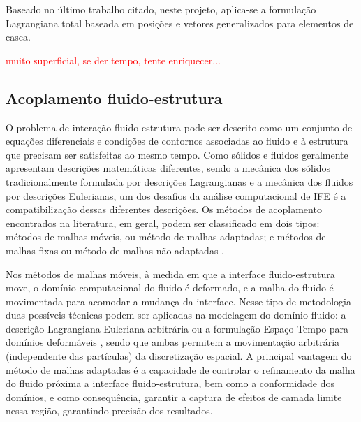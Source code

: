 \documentclass[tese_patricia.tex]{subfiles}
\begin{document}
Baseado no último trabalho citado, neste projeto, aplica-se a formulação Lagrangiana total baseada em posições e vetores generalizados para elementos de casca.

\textcolor{red}{muito superficial, se der tempo, tente enriquecer...}

\subsection{Acoplamento fluido-estrutura}
\label{couplingsection}

O problema de interação fluido-estrutura pode ser descrito como um conjunto de equações diferenciais e condições de contornos associadas ao fluido e à estrutura que precisam ser satisfeitas ao mesmo tempo. Como sólidos e fluidos geralmente apresentam descrições matemáticas diferentes, sendo a mecânica dos sólidos tradicionalmente formulada por descrições Lagrangianas e a mecânica dos fluidos por descrições Eulerianas, um dos desafios da análise computacional de IFE é a compatibilização dessas diferentes descrições. Os métodos de acoplamento encontrados na literatura, em geral, podem ser classificado em dois tipos: métodos de malhas móveis, ou método de malhas adaptadas; e métodos de malhas fixas ou método de malhas não-adaptadas \cite{Houetal:2012,BazilevsTT:2013b}.

Nos métodos de malhas móveis, à medida em que a interface fluido-estrutura move, o domínio computacional do fluido é deformado, e a malha do fluido é movimentada para acomodar a mudança da interface. Nesse tipo de metodologia duas possíveis técnicas podem ser aplicadas na modelagem do domínio fluido: a descrição Lagrangiana-Euleriana arbitrária \cite{HughesLZ:1981,DoneaGH:1982,KanchiM:2007} ou a formulação Espaço-Tempo para domínios deformáveis \cite{TezduyarBL:1992b,TezduyarBML:1992c,TakizawaT:2012}, sendo que ambas permitem a movimentação arbitrária (independente das partículas) da discretização espacial. A principal vantagem do método de malhas adaptadas é a capacidade de controlar o refinamento da malha do fluido próxima a interface fluido-estrutura, bem como a conformidade dos domínios, e como consequência, garantir a captura de efeitos de camada limite nessa região, garantindo precisão dos resultados.
\end{document}
